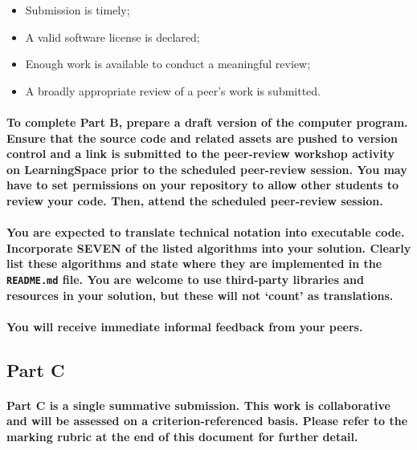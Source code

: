 \documentclass{../../fal_assignment}
\begin{document}
\begin{itemize}
	\item Submission is timely;
	\item A valid software license is declared;
	\item Enough work is available to conduct a meaningful review;
	\item A broadly appropriate review of a peer's work is submitted.
\end{itemize}

\paragraph{To complete Part B, prepare a draft version of the computer program. Ensure that the source code and related assets are pushed to version control and a link is submitted to the peer-review workshop activity on LearningSpace prior to the scheduled peer-review session. You may have to set permissions on your repository to allow other students to review your code. Then, attend the scheduled peer-review session.}

\paragraph{You are expected to translate technical notation into executable code. Incorporate \textbf{SEVEN} of the listed algorithms into your solution. Clearly list these algorithms and state where they are implemented in the \texttt{README.md} file. You are welcome to use third-party libraries and resources in your solution, but these will not `count' as translations.}

\paragraph{You will receive immediate \textbf{informal feedback} from your \textbf{peers}.}

\subsection*{Part C}

\paragraph{Part C is a \textbf{single summative submission}. This work is \textbf{collaborative} and will be assessed on a \textbf{criterion-referenced} basis. Please refer to the marking rubric at the end of this document for further detail.}
\end{document}
